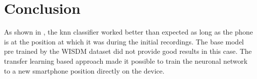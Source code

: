 \section{Conclusion}
As shown in , the \gls{knn} classifier worked better than expected as long as the phone is at the position at which it was during the initial recordings. The base model pre trained by the WISDM dataset did not provide good results in this case. The transfer learning based approach made it possible to train the neuronal network to a new smartphone position directly on the device.
